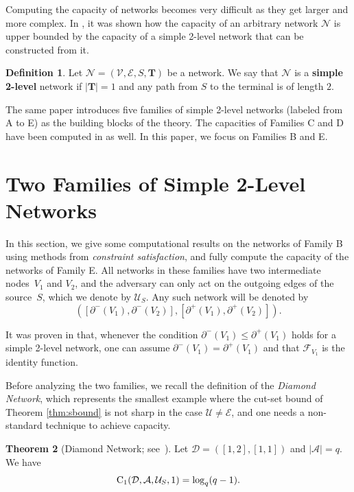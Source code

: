 \documentclass[11pt,a4paper]{article}
\theoremstyle{definition}
\newtheorem{theorem}{Theorem}[section]
\newtheorem{definition}[theorem]{Definition}
\newcommand{\mA}{\mathcal{A}}
\newcommand{\mN}{\mathcal{N}}
\newcommand{\mF}{\mathcal{F}}
\newcommand{\mD}{\mathcal{D}}
\newcommand{\mU}{\mathcal{U}}
\newcommand{\mE}{\mathcal{E}}
\newcommand{\mV}{\mathcal{V}}
\newcommand{\CC}{\textnormal{C}}
\newcommand{\degin}{\partial^-}
\newcommand{\degout}{\partial^+}
\begin{document}
Computing the capacity of networks becomes very difficult as they get larger and more complex. In \cite{beemer2023network}, it was shown how the capacity of an arbitrary network $\mN$ is upper bounded by the capacity of a simple 2-level network 
that can be constructed from it. 


\begin{definition}
\label{def:2-level}
Let $\mN=(\mV,\mE,S,\mathbf{T})$ be a network. We say that $\mN$ is a  \textbf{simple 2-level} network if $\lvert \mathbf{T} \rvert=1$ and any path from $S$ to the terminal is of length $2$.
\end{definition}

The same paper introduces five families of simple 2-level networks (labeled from A to E) as the building blocks of the theory. The capacities of Families C and D 
have been computed in \cite{beemer2023network} as well. In this paper, we focus on Families B and E. 


\section{Two Families of Simple 2-Level Networks}
\label{sec:threefam}

 In this section, we give some computational results on the networks of Family B using methods from \textit{constraint satisfaction}, and
 fully compute the capacity of the networks of Family E. All networks in these families
 have two intermediate nodes~$V_1$ and $V_2$, and the adversary can only act on the outgoing edges of the source~$S$, which we denote by $\mU_S$. 
 Any such network will be denoted by
$$([\degin(V_1),\degin(V_2)],[\degout(V_1),\degout(V_2)]).$$ 


It was proven in \cite[Lemma 6.5]{beemer2023network} that, 
whenever the condition $\degin(V_1) \le \degout(V_1)$ holds for a simple 2-level network, one can assume $\degin(V_1) = \degout(V_1)$ and that $\mF_{V_1}$ is the identity function.



Before analyzing the two families,
we recall the definition of the
\textit{Diamond Network}, which
represents the smallest example where the cut-set bound of Theorem \ref{thm:sbound} is not sharp in the case $\mU \neq \mE$, and one needs a non-standard technique to achieve capacity.






\begin{theorem}[Diamond Network; see~\cite{beemer2022network}]
\label{thm:diamond}
Let $\mD=([1,2],[1,1])$ and $|\mA|=q$. We have $$\CC_1(\mD,\mA,\mU_S,1) = \log_q(q-1).$$
\end{theorem}
\end{document}
